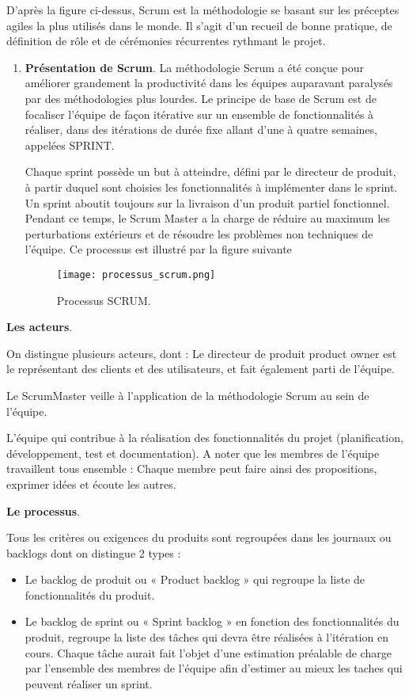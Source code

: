 D’après la figure ci-dessus, Scrum est la méthodologie se basant sur les préceptes agiles la plus utilisés dans le monde. Il s’agit d’un recueil de bonne pratique, de définition de rôle et de cérémonies récurrentes rythmant le projet.
\begin{enumerate}
	\item  \textbf{Présentation de Scrum}.
	La méthodologie Scrum a été conçue pour améliorer grandement la productivité dans les équipes auparavant paralysés par des méthodologies plus lourdes. Le principe de base de Scrum est de focaliser l’équipe de façon itérative sur un ensemble de fonctionnalités à réaliser, dans des itérations de durée fixe allant d’une à quatre semaines, appelées SPRINT. 
	
Chaque sprint possède un but à atteindre, défini par le directeur de produit, à partir duquel sont choisies les fonctionnalités à implémenter dans le sprint. Un sprint aboutit toujours sur la livraison d’un produit partiel fonctionnel. Pendant ce temps, le Scrum Master a la charge de réduire au maximum les perturbations extérieurs et de résoudre les problèmes non techniques de l’équipe. Ce processus est illustré par la figure suivante 

\begin{figure}[H]
	\centering
	\texttt{[image: processus\_scrum.png]}
	\caption{Processus SCRUM.}
	\label{fig:sp0}
\end{figure}
\end{enumerate}
	  \textbf{Les acteurs}.
	
	On distingue plusieurs acteurs, dont : 
Le directeur de produit product owner est le représentant des clients et des utilisateurs, et fait également parti de l’équipe. 

Le ScrumMaster veille à l'application de la méthodologie Scrum au sein de l’équipe. 

L’équipe qui contribue à la réalisation des fonctionnalités du projet (planification, développement, test et documentation). A noter que les membres de l’équipe travaillent tous ensemble : Chaque membre peut faire ainsi des propositions, exprimer idées et écoute les autres.

	\textbf{Le processus}.

Tous les critères ou exigences du produits sont regroupées dans les journaux ou backlogs dont on distingue 2 types : 

\begin{itemize}[label=\textbullet, font=\LARGE \color{blue}] 
	\item  Le backlog de produit ou « Product backlog » qui regroupe la liste de fonctionnalités du produit.
	\item  Le backlog de sprint ou « Sprint backlog » en fonction des fonctionnalités du produit, regroupe la liste des tâches qui devra être réalisées à l’itération en cours. Chaque tâche aurait fait l’objet d’une estimation préalable de charge par l’ensemble des membres de l’équipe afin d’estimer au mieux les taches qui peuvent réaliser un sprint.
\end{itemize}

